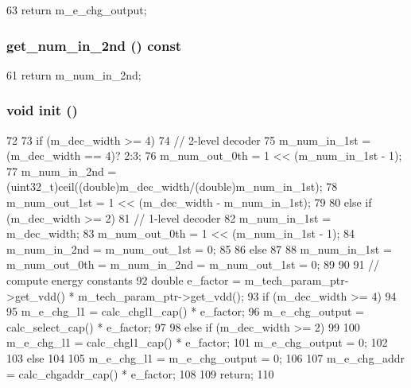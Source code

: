 \begin{DoxyCode}
63 { return m_e_chg_output; }
\end{DoxyCode}
\hypertarget{classDecoderUnit_aa1c4a00a38105789203640224c17ab51}{
\subsubsection[{get\_\-num\_\-in\_\-2nd}]{ get\_\-num\_\-in\_\-2nd () const}}
\label{classDecoderUnit_aa1c4a00a38105789203640224c17ab51}



\begin{DoxyCode}
61 { return m_num_in_2nd; }
\end{DoxyCode}
\hypertarget{classDecoderUnit_a02fd73d861ef2e4aabb38c0c9ff82947}{
\subsubsection[{init}]{\setlength{\rightskip}{0pt plus 5cm}void init ()}}
\label{classDecoderUnit_a02fd73d861ef2e4aabb38c0c9ff82947}



\begin{DoxyCode}
72 {
73     if (m_dec_width >= 4)
74     { // 2-level decoder
75         m_num_in_1st = (m_dec_width == 4)? 2:3;
76         m_num_out_0th = 1 << (m_num_in_1st - 1);
77         m_num_in_2nd = (uint32_t)ceil((double)m_dec_width/(double)m_num_in_1st);
78         m_num_out_1st = 1 << (m_dec_width - m_num_in_1st);
79     }
80     else if (m_dec_width >= 2)
81     { // 1-level decoder
82         m_num_in_1st = m_dec_width;
83         m_num_out_0th = 1 << (m_num_in_1st - 1);
84         m_num_in_2nd = m_num_out_1st = 0;
85     }
86     else
87     {
88         m_num_in_1st = m_num_out_0th = m_num_in_2nd = m_num_out_1st = 0;
89     }
90 
91     // compute energy constants
92     double e_factor = m_tech_param_ptr->get_vdd() * m_tech_param_ptr->get_vdd();
93     if (m_dec_width >= 4)
94     {
95         m_e_chg_l1 = calc_chgl1_cap() * e_factor;
96         m_e_chg_output = calc_select_cap() * e_factor;
97     }
98     else if (m_dec_width >= 2)
99     {
100         m_e_chg_l1 = calc_chgl1_cap() * e_factor;
101         m_e_chg_output = 0;
102     }
103     else
104     {
105         m_e_chg_l1 = m_e_chg_output = 0;
106     }
107     m_e_chg_addr = calc_chgaddr_cap() * e_factor;
108 
109     return;
110 }
\end{DoxyCode}


